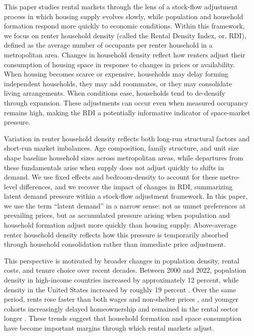 \documentclass[pdflatex,sn-apa]{sn-jnl}%
\theoremstyle{thmstyleone}%
\theoremstyle{thmstyletwo}%
\theoremstyle{thmstylethree}%
\begin{document}
This paper studies rental markets through the lens of a stock-flow adjustment process in which housing supply evolves slowly, while population and household formation respond more quickly to economic conditions. Within this framework, we focus on renter household density (called the Rental Density Index, or, RDI), defined as the average number of occupants per renter household in a metropolitan area. Changes in household density reflect how renters adjust their consumption of housing space in response to changes in prices or availability. When housing becomes scarce or expensive, households may delay forming independent households, they may add roommates, or they may consolidate living arrangements. When conditions ease, households tend to de-densify through expansion. These adjustments can occur even when measured occupancy remains high, making the RDI a potentially informative indicator of space-market pressure.

Variation in renter household density reflects both long-run structural factors and short-run market imbalances. Age composition, family structure, and unit size shape baseline household sizes across metropolitan areas, while departures from these fundamentals arise when supply does not adjust quickly to shifts in demand. We use fixed effects and bedroom-density to account for these metro-level differences, and we recover the impact of changes in RDI, summarizing latent demand pressure within a stock-flow adjustment framework. In this paper, we use the term “latent demand” in a narrow sense: not as unmet preferences at prevailing prices, but as accumulated pressure arising when population and household formation adjust more quickly than housing supply. Above-average renter household density reflects how this pressure is temporarily absorbed through household consolidation rather than immediate price adjustment. 

This perspective is motivated by broader changes in population density, rental costs, and tenure choice over recent decades. Between 2000 and 2022, population density in high-income countries increased by approximately 12 percent, while density in the United States increased by roughly 19 percent \cite{worldbankPopDensity}. Over the same period, rents rose faster than both wages and non-shelter prices \cite{feiveson2024rent, stlouisfedConsumerPrice}, and younger cohorts increasingly delayed homeownership and remained in the rental sector longer \cite{fanniemaeConsumersFeeling}. These trends suggest that household formation and space consumption have become important margins through which rental markets adjust.
\end{document}
